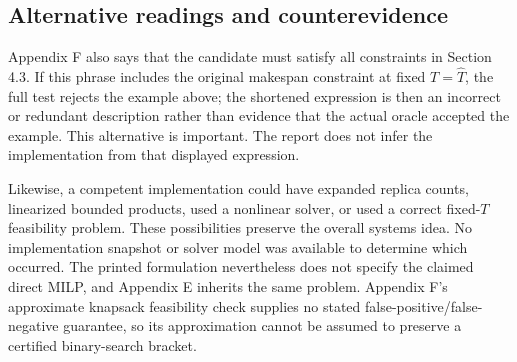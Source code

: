 \documentclass[10pt]{article}
\begin{document}
\subsection*{Alternative readings and counterevidence}
Appendix F also says that the candidate must satisfy all constraints in Section 4.3. If this phrase includes the original makespan constraint at fixed \(T=\widehat T\), the full test rejects the example above; the shortened expression is then an incorrect or redundant description rather than evidence that the actual oracle accepted the example. This alternative is important. The report does not infer the implementation from that displayed expression.\par
Likewise, a competent implementation could have expanded replica counts, linearized bounded products, used a nonlinear solver, or used a correct fixed-\(T\) feasibility problem. These possibilities preserve the overall systems idea. No implementation snapshot or solver model was available to determine which occurred. The printed formulation nevertheless does not specify the claimed direct MILP, and Appendix E inherits the same problem. Appendix F’s approximate knapsack feasibility check supplies no stated false-positive/false-negative guarantee, so its approximation cannot be assumed to preserve a certified binary-search bracket.\par
\end{document}
